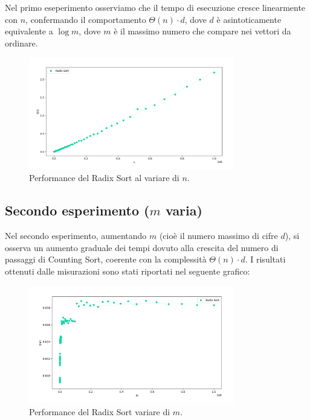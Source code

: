 \documentclass[a4paper, 12pt, oneside]{book}
\begin{document}
Nel primo eseperimento osserviamo che il tempo di esecuzione cresce linearmente con \(n\), confermando il comportamento \(\Theta (n )\cdot d\), dove $d$ è asintoticamente equivalente a $\log m$, dove $m$ è il massimo numero che compare nei vettori da ordinare.

\begin{figure}[H]
    \centering
    \includegraphics[width=0.8\textwidth]{images/grafico_radix_sort_n.png}
    \caption{Performance del Radix Sort al variare di \(n\).}
    \label{fig:radix_sort_way_n}
\end{figure}

\subsection{Secondo esperimento ($m$ varia)}

Nel secondo esperimento, aumentando \(m\) (cioè il numero massimo di cifre \(d\)), si osserva un aumento graduale dei tempi dovuto alla crescita del numero di passaggi di Counting Sort, coerente con la complessità \(\Theta(n) \cdot d \).
I risultati ottenuti dalle misurazioni sono stati riportati nel seguente grafico:

\begin{figure}[H]
    \centering
    \includegraphics[width=0.8\textwidth]{images/grafico_radix_sort_m.png}
    \caption{Performance del Radix Sort variare di \(m\).}
    \label{fig:radix_sort_3_way_m}
\end{figure}
\end{document}
